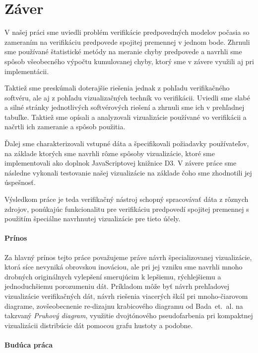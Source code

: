 \chapter*{Záver}

V našej práci sme uviedli problém verifikácie predpovedných modelov počasia so zameraním na verifikáciu predpovede spojitej premennej v jednom bode. Zhrnuli sme používané štatistické metódy na meranie chyby predpovede a navrhli sme spôsob všeobecného výpočtu kumulovanej chyby, ktorý sme v závere využili aj pri implementácii.

Taktiež sme preskúmali doterajšie riešenia jednak z pohľadu verifikačného softvéru, ale aj z pohľadu vizualizačných techník vo verifikácii. Uviedli sme slabé a silné stránky jednotlivých softvérových riešení a zhrnuli sme ich v prehľadnej tabuľke. Taktiež sme opísali a analyzovali vizualizácie používané vo verifikácii a načrtli ich zameranie a spôsob použitia.

Ďalej sme charakterizovali vstupné dáta a špecifikovali požiadavky používateľov, na základe ktorých sme navrhli rôzne spôsoby vizualizácie, ktoré sme implementovali ako doplnok JavaScriptovej knižnice D3. V závere práce sme následne vykonali testovanie našej vizualizácie na základe čoho sme zhodnotili jej úspešnosť.

Výsledkom práce je teda verifikačný nástroj schopný spracovávať dáta z rôznych zdrojov, ponúkajúc funkcionalitu pre verifikáciu predpovedí spojitej premennej s použitím špeciálne navrhnutej vizualizácie pre tieto účely. 

\subsubsection{Prínos}

Za hlavný prínos tejto práce považujeme práve návrh špecializovanej vizualizácie, ktorá síce nevyniká obrovskou inováciou, ale pri jej vzniku sme navrhli mnoho drobných originálnych vylepšení smerujúcim k lepšiemu, rýchlejšiemu a jednoduchšiemu porozumeniu dát. Príkladom môže byť návrh prehľadovej vizualizácie verifikačných dát, návrh riešenia viacerých škál pri \mbox{mnoho-čiarovom} diagrame, zovšeobecnenie re-dizajnu krabicového diagramu od \mbox{Bada et. al.} \cite{Bade} na takzvaný \textit{Pruhový diagram}, využitie dvojtónového pseudofarbenia pri kompaktnej vizualizácii distribúcie dát pomocou grafu hustoty a podobne.

\subsubsection{Budúca práca}

